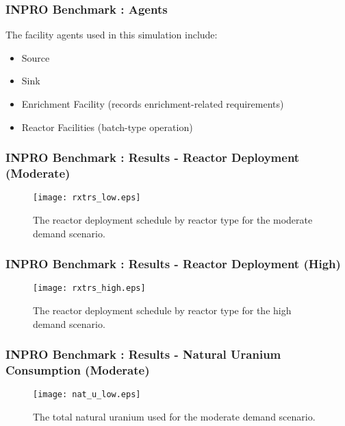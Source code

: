 
\begin{frame}
  \frametitle{INPRO Benchmark : Agents}
  The facility agents used in this simulation include:
  \begin{itemize}
    \item Source 
    \item Sink
    \item Enrichment Facility (records enrichment-related requirements)
    \item Reactor Facilities (batch-type operation)
  \end{itemize}
\end{frame}

\begin{frame}
  \frametitle{INPRO Benchmark : Results - Reactor Deployment (Moderate)}  
  \begin{figure}[htbp!]
    \begin{center}
      \texttt{[image: rxtrs\_low.eps]}
      \caption{The reactor deployment schedule by reactor type for the moderate demand scenario.}
      \label{fig:rxtrs_low}
    \end{center}  
  \end{figure}
\end{frame}

\begin{frame}
  \frametitle{INPRO Benchmark : Results - Reactor Deployment (High)}  
  \begin{figure}[htbp!]
    \begin{center}
      \texttt{[image: rxtrs\_high.eps]}
      \caption{The reactor deployment schedule by reactor type for the high demand scenario.}
      \label{fig:rxtrs_high}
    \end{center}  
  \end{figure}
\end{frame}

\begin{frame}
  \frametitle{INPRO Benchmark : Results - Natural Uranium Consumption (Moderate)}  
  \begin{figure}[htbp!]
    \begin{center}
      \texttt{[image: nat\_u\_low.eps]}
      \caption{The total natural uranium used for the moderate demand scenario.}
      \label{fig:nat_u_low}
    \end{center}  
  \end{figure}
\end{frame}

